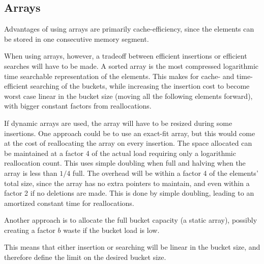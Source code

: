 \subsection{Arrays}
Advantages of using arrays are primarily cache-efficiency, since the
elements can be stored in one consecutive memory segment.

When using arrays, however, a tradeoff between efficient insertions or
efficient searches will have to be made. A sorted array is the most compressed
logarithmic time searchable representation of the elements. This makes for
cache- and time-efficient searching of the buckets, while increasing the
insertion cost to become worst case linear in the bucket size (moving all the
following elements forward), with bigger constant factors from reallocations.

If dynamic arrays are used, the array will have to be resized during some
insertions. One approach could be to use an exact-fit array, but this would
come at the cost of reallocating the array on every insertion. The space
allocated can be maintained at a factor 4 of the actual load requiring only a
logarithmic reallocation count. This uses simple doubling when full and halving
when the array is less than $1/4$ full. The overhead will be within a
factor 4 of the elements' total size, since the array has no extra pointers to
maintain, and even within a factor 2 if no deletions are made. This is done
by simple doubling, leading to an amortized constant time for reallocations. 

Another approach is to allocate the full bucket capacity (a static array),
possibly creating a factor $b$ waste if the bucket load is low.

This means that either insertion or searching will be linear in the bucket
size, and therefore define the limit on the desired bucket size.


